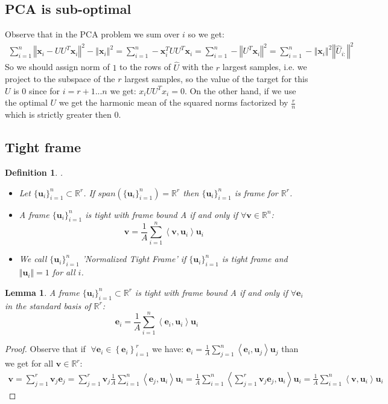 \documentclass{article}
\newtheorem{definition}{Definition}
\newtheorem{lemma}[theorem]{Lemma}
\newcommand{\x}{{\mathbf x}}
\renewcommand{\u}{{\mathbf u}}
\renewcommand{\v}{{\mathbf v}}
\newcommand{\e}{{\mathbf e}}
\newcommand{\R}{\mathbb{R}}
\begin{document}
\subsection{PCA is sub-optimal}

Observe that in the PCA problem we sum over $i$ so we get:
\begin{align*}
    \sum_{i=1}^n\left\Vert\x_i-UU^T\x_i\right\Vert^2 - \left\Vert\x_{i}\right\Vert^2 =\sum_{i=1}^n-\x_i^TUU^T\x_i
    =\sum_{i=1}^n-\left\Vert U^T\x_{i}\right\Vert^2
    =\sum_{i=1}^n-\left\Vert\x_{i}\right\Vert^2\left\Vert \hat{U}_{i:}\right\Vert^2
\end{align*}
So we should assign norm of $1$ to the rows of $\hat{U}$ with the $r$ largest samples, i.e. we project to the subspace of the $r$ largest samples, so the value of the target for this $U$ is 0 since for $i=r+1...n$ we get: $x_iUU^Tx_i=0$. On the other hand, if we use the optimal $U$ we get the harmonic mean of the squared norms factorized by $\frac{r}{n}$ which is strictly greater then 0.


\subsection{Tight frame}

\begin{definition}.
\begin{itemize}
    \item Let $\{\u_i\}_{i=1}^n\subset\mathbb{R}^r$. If $span(\{\u_i\}_{i=1}^n)=\mathbb{R}^r$ then $\{\u_i\}_{i=1}^n$ is frame for $\mathbb{R}^r$.
    \item A frame $\{\u_i\}_{i=1}^n$ is tight with frame bound A if and only if $\forall \v\in\mathbb{R}^n$:
    $$\v=\frac{1}{A}\sum_{i=1}^n\left<\v,\u_i\right>\u_i$$
    \item We call $\{\u_i\}_{i=1}^n$ 'Normalized Tight Frame' if $\{\u_i\}_{i=1}^n$ is tight frame and $\Vert \u_i\Vert=1$ for all $i$.
\end{itemize}
\end{definition}

\begin{lemma}\label{standard basis enough}
A frame $\{\u_i\}_{i=1}^n\subset\mathbb{R}^r$ is tight with frame bound A if and only if $\forall \e_i$ in the standard basis of $\R^r$:
    $$\e_i=\frac{1}{A}\sum_{i=1}^n\left<\e_i,\u_i\right>\u_i$$
\end{lemma}

\begin{proof}
Observe that if $\;\forall \e_{i}\in\left\{ \e_{i}\right\} _{i=1}^{r}$ we have: $\e_{i}=\frac{1}{A}\sum_{j=1}^{n}\left\langle \e_{i},\u_{j}\right\rangle \u_{j}$ than we get for all $\v\in\mathbb{R}^{r}$:
\begin{align*}
    \v=	\sum_{j=1}^{r}\v_{j}\e_{j}
=	\sum_{j=1}^{r}\v_{j}\frac{1}{A}\sum_{i=1}^{n}\left\langle \e_{j},\u_{i}\right\rangle \u_{i}
=	\frac{1}{A}\sum_{i=1}^{n}\left\langle \sum_{j=1}^{r}\v_{j}\e_{j},\u_{i}\right\rangle \u_{i}
=	\frac{1}{A}\sum_{i=1}^{n}\left\langle \v,\u_{i}\right\rangle \u_{i}
\end{align*}
\end{proof}
\end{document}
